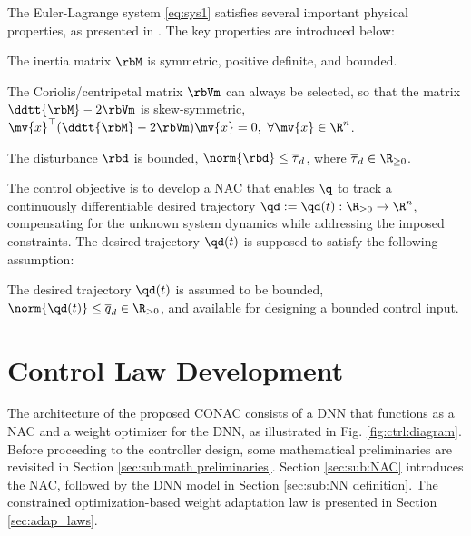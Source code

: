 \documentclass[letterpaper, journal]{IEEEtran}
\begin{document}
The Euler-Lagrange system \eqref{eq:sys1} satisfies several important physical properties, as presented in \cite[Chap. 3, Tab. 3.2.1]{Lewis:1998aa}. 
The key properties are introduced below:
\begin{prop} 
    The inertia matrix $\rbM$ is symmetric, positive definite, and bounded.
    \label{prop:M}
\end{prop}

\begin{prop} 
    The Coriolis/centripetal matrix $\rbVm$ can always be selected, so that the matrix $\ddtt{\rbM}-2\rbVm$ is skew-symmetric, \ie $\mv{x}^\top(\ddtt{\rbM}-2\rbVm)\mv{x}=0,\ \forall \mv{x}\in\R^n$.
    \label{prop:skew}
\end{prop}

\begin{prop}
    The disturbance $\rbd$ is bounded, \ie $\norm{\rbd}\le \overline\tau_d$, where $\overline\tau_d\in\R_{\ge0}$.
    \label{prop:dis_bound}
\end{prop}

The control objective is to develop a NAC that enables $\q$ to track a continuously differentiable desired trajectory $\qd:=\qd(t): \R_{\ge0} \to \R^n$, compensating for the unknown system dynamics while addressing the imposed constraints.
The desired trajectory $\qd(t)$ is supposed to satisfy the following assumption:
\begin{assum}
    The desired trajectory $\qd(t)$ is assumed to be bounded, \ie $\norm{\qd(t)}\le \overline{q}_d\in\R_{>0}$, and available for designing a bounded control input.
    \label{assum:feasible}
\end{assum}

\section{Control Law Development}\label{sec:ctrl design}

The architecture of the proposed CONAC consists of a DNN that functions as a NAC and a weight optimizer for the DNN, as illustrated in Fig. \ref{fig:ctrl:diagram}.
Before proceeding to the controller design, some mathematical preliminaries are revisited in Section \ref{sec:sub:math preliminaries}. 
Section \ref{sec:sub:NAC} introduces the NAC, followed by the DNN model in Section \ref{sec:sub:NN definition}. 
The constrained optimization-based weight adaptation law is presented in Section \ref{sec:adap_laws}.
\end{document}
